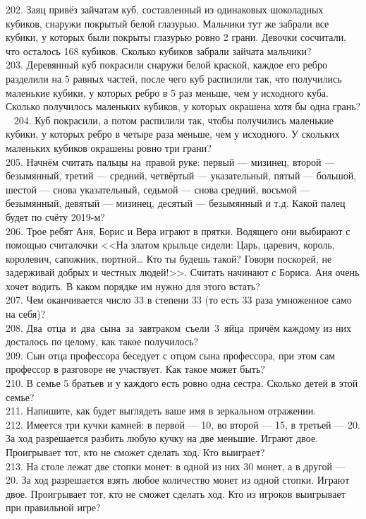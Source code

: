 202. Заяц привёз зайчатам куб, составленный из одинаковых шоколадных кубиков, снаружи покрытый белой глазурью. Мальчики тут же забрали все кубики, у которых были покрыты глазурью ровно 2 грани. Девочки сосчитали, что осталось 168 кубиков. Сколько кубиков забрали зайчата мальчики?\\
203. Деревянный куб покрасили снаружи белой краской, каждое его ребро разделили на 5 равных частей, после чего куб распилили так, что получились маленькие кубики, у которых ребро в 5 раз меньше, чем у исходного куба. Сколько получилось маленьких кубиков, у которых окрашена хотя бы одна грань?\\ 
204. Куб покрасили, а потом распилили так, чтобы получились маленькие кубики, у которых ребро в четыре раза меньше, чем у исходного. У скольких маленьких кубиков окрашены ровно три грани?\\
205. Начнём считать пальцы на правой руке: первый --- мизинец, второй --- безымянный, третий --- средний, четвёртый --- указательный, пятый --- большой, шестой --- снова указательный, седьмой --- снова средний, восьмой --- безымянный, девятый --- мизинец, десятый --- безымянный и т.д. Какой палец будет по счёту 2019-м?\\
206. Трое ребят Аня, Борис и Вера играют в прятки. Водящего они выбирают с помощью считалочки <<На златом крыльце сидели: Царь, царевич, король, королевич, сапожник, портной… Кто ты будешь такой? Говори поскорей, не задерживай добрых и честных людей!>>. Считать начинают с Бориса. Аня очень хочет водить.  В каком порядке им нужно для этого встать?\\
207. Чем оканчивается число 33 в степени 33 (то есть 33 раза умноженное само на себя)?\\
208. Два отца и два сына за завтраком съели 3 яйца причём каждому из них досталось по целому, как такое получилось?\\
209. Сын отца профессора беседует с отцом сына профессора, при этом сам профессор в разговоре не участвует. Как такое может быть?\\
210. В семье 5 братьев и у каждого есть ровно одна сестра. Сколько детей в этой семье?\\
211. Напишите, как будет выглядеть ваше имя в зеркальном отражении.\\
212. Имеется три кучки камней: в первой --- 10, во второй --- 15, в третьей --- 20. За ход разрешается разбить любую кучку на две меньшие. Играют двое. Проигрывает тот, кто не сможет сделать ход. Кто выиграет?\\
213. На столе лежат две стопки монет: в одной из них 30 монет, а в другой --- 20. За ход разрешается взять любое количество монет из одной стопки. Играют двое. Проигрывает тот, кто не сможет сделать ход. Кто из игроков выигрывает при правильной игре?\\

